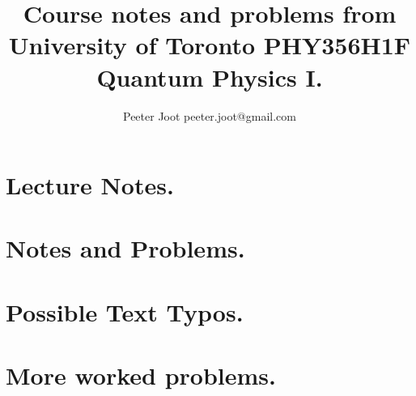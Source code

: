 \documentclass[12pt,leqno]{book}
\begin{document}

\title{Course notes and problems from\\University of Toronto PHY356H1F\\Quantum Physics I.}
\author{Peeter Joot \quad peeter.joot@gmail.com}

\maketitle

\clearpage{}
\tableofcontents

\clearpage{}

\pagestyle{plain}




\part{Lecture Notes.}


\part{Notes and Problems.}














\part{Possible Text Typos.}


\part{More worked problems.}








%




\end{document}
